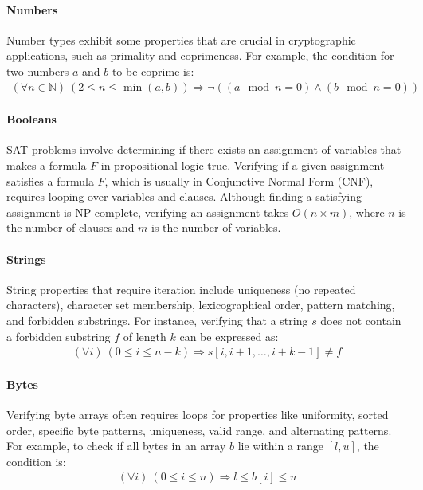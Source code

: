 \documentclass[runningheads]{llncs}
\begin{document}
\paragraph{\textbf{Numbers}}
Number types exhibit some properties that are crucial in cryptographic applications, such as primality and coprimeness. For example, the condition for two numbers \(a\) and \(b\) to be coprime is:
\begin{gather*}
\label{}
(\forall n \in \mathbb{N}) \ (2 \leq n \leq \min(a, b)) \Rightarrow \neg((a \mod n = 0) \wedge (b \mod n = 0))
\end{gather*}
\paragraph{\textbf{Booleans}}
SAT problems involve determining if there exists an assignment of variables that makes a formula \( F \) in propositional logic true. Verifying if a given assignment satisfies a formula \( F \), which is usually in Conjunctive Normal Form (CNF), requires looping over variables and clauses. Although finding a satisfying assignment is NP-complete, verifying an assignment takes \( O(n \times m) \), where \( n \) is the number of clauses and \( m \) is the number of variables.
\paragraph{\textbf{Strings}}
String properties that require iteration include uniqueness (no repeated characters), character set membership, lexicographical order, pattern matching, and forbidden substrings. For instance, verifying that a string \(s\) does not contain a forbidden substring \(f\) of length \(k\) can be expressed as:
\begin{gather*}
(\forall i) \ (0 \leq i \leq n - k) \Rightarrow s[i, i+1, \dots, i+k-1] \neq f
\end{gather*}
\paragraph{\textbf{Bytes}}
Verifying byte arrays often requires loops for properties like uniformity, sorted order, specific byte patterns, uniqueness, valid range, and alternating patterns. For example, to check if all bytes in an array \(b\) lie within a range \([l, u]\), the condition is:
\begin{gather*}
(\forall i) \ (0 \leq i \leq n) \Rightarrow l \leq b[i] \leq u
\end{gather*}
\end{document}
